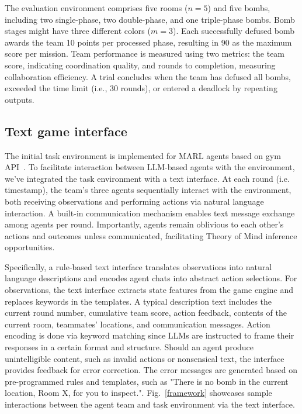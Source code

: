 \documentclass[11pt]{article}
\begin{document}
The evaluation environment comprises five rooms ($n = 5$) and five bombs, including two single-phase, two double-phase, and one triple-phase bombs. Bomb stages might have three different colors ($m = 3$). Each successfully defused bomb awards the team 10 points per processed phase, resulting in 90 as the maximum score per mission. Team performance is measured using two metrics: the team score, indicating coordination quality, and rounds to completion, measuring collaboration efficiency. A trial concludes when the team has defused all bombs, exceeded the time limit (i.e., 30 rounds), or entered a deadlock by repeating outputs. 

\subsection{Text game interface}
The initial task environment is implemented for MARL agents based on gym API~\cite{1606.01540}. To facilitate interaction between LLM-based agents with the environment, we've integrated the task environment with a text interface. At each round (i.e. timestamp), the team's three agents sequentially interact with the environment, both receiving observations and performing actions via natural language interaction. A built-in communication mechanism enables text message exchange among agents per round. Importantly, agents remain oblivious to each other's actions and outcomes unless communicated, facilitating Theory of Mind inference opportunities.


Specifically, a rule-based text interface translates observations into natural language descriptions and encodes agent chats into abstract action selections. For observations, the text interface extracts state features from the game engine and replaces keywords in the templates. A typical description text includes the current round number, cumulative team score, action feedback, contents of the current room, teammates' locations, and communication messages. Action encoding is done via keyword matching since LLMs are instructed to frame their responses in a certain format and structure. Should an agent produce unintelligible content, such as invalid actions or nonsensical text, the interface provides feedback for error correction. The error messages are generated based on pre-programmed rules and templates, such as "There is no bomb in the current location, Room X, for you to inspect.". Fig.~\ref{framework} showcases sample interactions between the agent team and task environment via the text interface.
\end{document}
